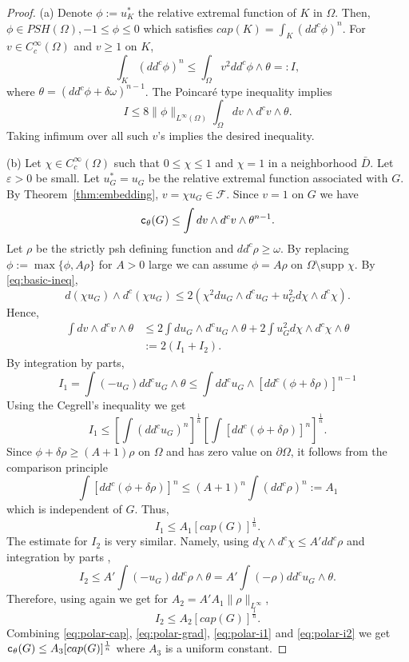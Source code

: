 \documentclass{amsart}
\renewcommand{\d}{\partial}
\newcommand{\veps}{\varepsilon}
\newcommand{\de}{\delta}
\newcommand{\om}{\omega}
\newcommand{\te}{\theta}
\newcommand{\tc}{{\tt c}}
\newcommand{\Om}{\Omega}
\newcommand{\cF}{\mathcal{F}}
\newcommand{\supp}{\mbox{supp }}
\theoremstyle{definition}
\numberwithin{thm}{section}
\numberwithin{equation}{section}
\renewcommand{\[}{\begin{equation}}
\renewcommand{\]}{\end{equation}}
\newcommand{\wed}{\wedge}
\begin{document}
\begin{proof} (a)
Denote $\phi:= u_K^*$ the relative extremal function of $K$ in $\Om$. Then, $\phi \in PSH(\Om), -1\leq \phi \leq 0$ which satisfies $cap (K) = \int_K (dd^c \phi)^n$. For $v \in C^\infty_c(\Om)$ and $v \geq 1$ on $K$,
$$
	\int_K (dd^c\phi)^n \leq \int_\Om v^2 dd^c\phi \wed \te =:I,
$$ 
where $\te = (dd^c\phi + \de \om)^{n-1}$.  The Poincar\'e type inequality \cite[Th\'eor\`em~1] {Okada82} implies
$$
	I\leq   8\|\phi\|_{L^\infty(\Om)} \int_\Om d v \wed d^c v \wed \te.
$$
Taking infimum over all such $v$'s implies the desired inequality.

(b) Let $\chi \in C^\infty_c(\Om)$ such that $0\leq \chi \leq 1$ and $\chi =1$ in a neighborhood $\bar D$. Let   $\veps>0$ be small. Let $u_G^*= u_G$ be the relative extremal function associated with $G$. By Theorem~\ref{thm:embedding}, $v=\chi u_G \in \cF$. Since   $v =1$ on $G$ we have
\[\label{eq:polar-cap}
	\tc_\te(G) \leq	\int dv \wed d^c v \wed \te^{n-1}.
\]
Let $\rho$ be the strictly psh defining function and $dd^c\rho \geq \om$. By replacing $\phi:= \max\{\phi, A\rho\}$ for $A>0$ large we can assume $\phi = A \rho$ on  $\Om\setminus \supp\chi$. By \eqref{eq:basic-ineq},
$$
	d(\chi u_G) \wed d^c (\chi u_G) \leq 2(\chi^2 du_G \wed d^c u_G + u_G^2 d\chi \wed d^c \chi).
$$
Hence, 
\[\label{eq:polar-grad}\begin{aligned}
	\int dv \wed d^c v \wed \te &\leq 2\int du_G \wed d^c u_G \wed \te + 2 \int u_G^2 d\chi \wed d^c\chi \wed \te \\ &:=2 (I_1 + I_2).
\end{aligned}
\]
By integration by parts,
$$
	I_1 = \int (-u_G) dd^c u_G \wed \te \leq \int dd^c u_G \wed [dd^c (\phi+\de\rho)]^{n-1}
$$
Using the Cegrell's inequality \cite{Ce04} we get
\[\label{eq:polar-i1}
	I_1 \leq \left[\int (dd^c u_G)^n\right]^\frac{1}{n} \left[ \int [dd^c(\phi + \de \rho)]^n  \right]^\frac{1}{n}.
\]
Since $\phi + \de \rho \geq (A+1)\rho$ on $\Om$ and has zero value on $\d\Om$, it follows from the comparison principle 
$$
	\int [dd^c(\phi + \de \rho)]^n  \leq (A+1)^n \int (dd^c\rho)^n:= A_1
$$
which is independent of $G$.
Thus, $$I_1 \leq A_1 [cap (G)]^\frac{1}{n}.$$
The estimate for $I_2$ is very similar. Namely, using $d\chi \wed d^c\chi \leq A' dd^c \rho$ and integration by parts \cite[Proposition~2.1.3]{Blocki-lect-ma},
$$
	I_2 \leq A' \int (-u_G) dd^c \rho \wed \te = A' \int (-\rho) dd^cu_G \wed \te.
$$
Therefore, using again \cite{Ce04} we get for $A_2 = A' A_1 \|\rho\|_{L^\infty}$,
\[\label{eq:polar-i2}I_2 \leq A_2 [cap (G)]^\frac{1}{n}.
\] 
Combining \eqref{eq:polar-cap}, \eqref{eq:polar-grad}, \eqref{eq:polar-i1} and \eqref{eq:polar-i2} we get $\tc_\te (G) \leq A_3  [cap (G)]^\frac{1}{n}$ where $A_3$ is a uniform constant.
\end{proof}
\end{document}
